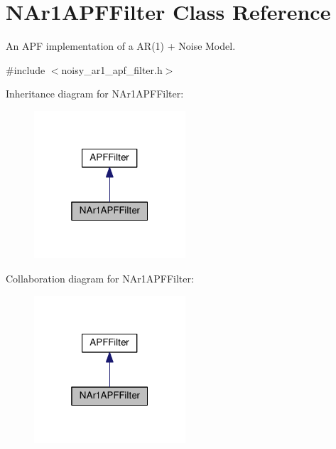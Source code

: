 \hypertarget{classNAr1APFFilter}{}\section{N\+Ar1\+A\+P\+F\+Filter Class Reference}
\label{classNAr1APFFilter}


An A\+PF implementation of a A\+R(1) + Noise Model.  




{\ttfamily \#include $<$noisy\+\_\+ar1\+\_\+apf\+\_\+filter.\+h$>$}



Inheritance diagram for N\+Ar1\+A\+P\+F\+Filter\+:\nopagebreak
\begin{figure}[H]
\begin{center}
\leavevmode
\includegraphics[width=160pt]{classNAr1APFFilter__inherit__graph}
\end{center}
\end{figure}


Collaboration diagram for N\+Ar1\+A\+P\+F\+Filter\+:\nopagebreak
\begin{figure}[H]
\begin{center}
\leavevmode
\includegraphics[width=160pt]{classNAr1APFFilter__coll__graph}
\end{center}
\end{figure}
